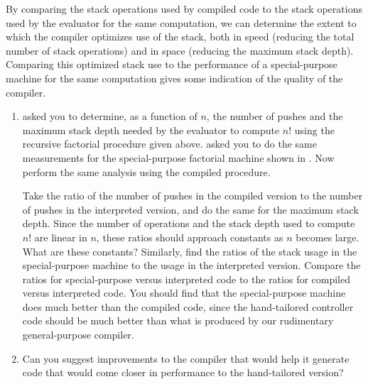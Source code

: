 \begin{exercise}
	\label{Exercise 5.45}
	By comparing the stack operations used by compiled code to the stack operations used by the evaluator for the same computation, we can determine the extent to which the compiler optimizes use of the stack, both in speed (reducing the total number of stack operations) and in space (reducing the maximum stack depth).
	Comparing this optimized stack use to the performance of a special-purpose machine for the same computation gives some indication of the quality of the compiler.
	\begin{enumerate}[label = \alph*., leftmargin = *]

		\item
			 asked you to determine, as a function of \( n \), the number of pushes and the maximum stack depth needed by the evaluator to compute \( n! \) using the recursive factorial procedure given above.
			 asked you to do the same measurements for the special-purpose factorial machine shown in .
			Now perform the same analysis using the compiled  procedure.

			Take the ratio of the number of pushes in the compiled version to the number of pushes in the interpreted version, and do the same for the maximum stack depth.
			Since the number of operations and the stack depth used to compute \( n! \)  are linear in \( n \), these ratios should approach constants as \( n \) becomes large.
			What are these constants?
			Similarly, find the ratios of the stack usage in the special-purpose machine to the usage in the interpreted version.
			Compare the ratios for special-purpose versus interpreted code to the ratios for compiled versus interpreted code.
			You should find that the special-purpose machine does much better than the compiled code, since the hand-tailored controller code should be much better than what is produced by our rudimentary general-purpose compiler.

		\item
			Can you suggest improvements to the compiler that would help it generate code that would come closer in performance to the hand-tailored version?

	\end{enumerate}
\end{exercise}



